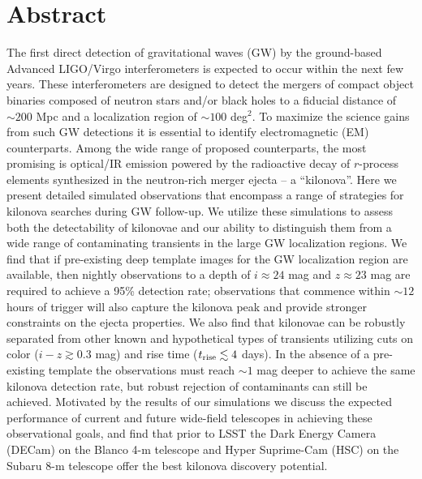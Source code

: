 
\section*{Abstract}
The first direct detection of gravitational waves (GW) by the ground-based Advanced LIGO/Virgo interferometers is expected to occur within the next few years.  These interferometers are designed to detect the mergers of compact object binaries composed of neutron stars and/or black holes to a fiducial distance of $\sim 200$ Mpc and a localization region of $\sim 100$ deg$^2$.  To maximize the science gains from such GW detections it is essential to identify electromagnetic (EM) counterparts.  Among the wide range of proposed counterparts, the most promising is optical/IR emission powered by the radioactive decay of $r$-process elements synthesized in the neutron-rich merger ejecta -- a ``kilonova''.  Here we present detailed simulated observations that encompass a range of strategies for kilonova searches during GW follow-up.  We utilize these simulations to assess both the detectability of kilonovae and our ability to distinguish them from a wide range of contaminating transients in the large GW localization regions.  We find that if pre-existing deep template images for the GW localization region are available, then nightly observations to a depth of $i\approx 24$ mag and $z\approx 23$ mag are required to achieve a 95\% detection rate; observations that commence within $\sim 12$ hours of trigger will also capture the kilonova peak and provide stronger constraints on the ejecta properties.  We also find that kilonovae can be robustly separated from other known and hypothetical types of transients utilizing cuts on color ($i-z\gtrsim 0.3$ mag) and rise time ($t_{{\rm rise}}\lesssim 4$ days).  In the absence of a pre-existing template the observations must reach $\sim 1$ mag deeper to achieve the same kilonova detection rate, but robust rejection of contaminants can still be achieved.  Motivated by the results of our simulations we discuss the expected performance of current and future wide-field telescopes in achieving these observational goals, and find that prior to LSST the Dark Energy Camera (DECam) on the Blanco 4-m telescope and Hyper Suprime-Cam (HSC) on the Subaru 8-m telescope offer the best kilonova discovery potential.

